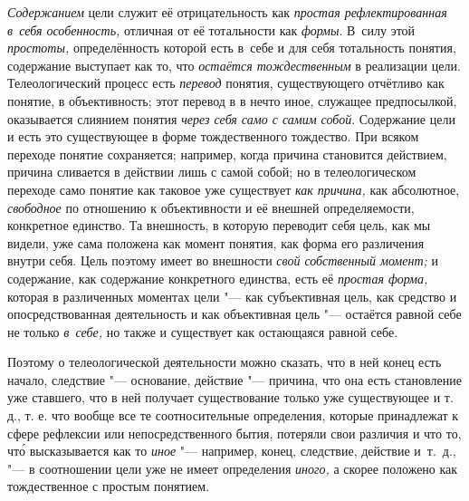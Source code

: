 {\em Содержанием} цели
служит её отрицательность как
{\em простая рефлектированная в~себя
особенность,} отличная от её тотальности как
{\em формы}. В~силу этой
{\em простоты,}
определённость которой есть в~себе и для себя тотальность
понятия, содержание выступает как то, что
{\em остаётся тождественным}
в реализации цели. Телеологический процесс есть
{\em перевод} понятия,
существующего отчётливо как понятие, в объективность; этот перевод в
в нечто иное, служащее предпосылкой, оказывается слиянием понятия
{\em через себя само с самим собой}.
Содержание цели и есть это существующее в форме
тождественного тождество. При всяком переходе понятие сохраняется;
например, когда причина становится действием, причина сливается в действии
лишь с самой собой; но в телеологическом переходе само понятие как таковое
уже существует {\em как причина,}
как абсолютное,
{\em свободное} по
отношению к объективности и её внешней определяемости, конкретное единство.
Та внешность, в которую переводит себя цель, как мы видели, уже сама
положена как момент понятия, как форма его различения внутри себя. Цель
поэтому имеет во внешности {\em свой
собственный момент;} и содержание, как содержание
конкретного единства, есть её
{\em простая форма,}
которая в различенных моментах цели "--- как
субъективная цель, как средство и опосредствованная деятельность и как
объективная цель "--- остаётся равной себе не только
{\em в~себе,} но также и
существует как остающаяся равной себе.

Поэтому о телеологической деятельности можно сказать, что в
ней конец есть начало, следствие "--- основание, действие
"--- причина, что она есть становление уже ставшего, что в ней
получает существование только уже существующее и т. д., т. е. что вообще
все те соотносительные определения, которые принадлежат к сфере рефлексии
или непосредственного бытия, потеряли свои различия и что то, чт\'{о}
высказывается как то
{\em иное} "--- например,
конец, следствие, действие и~т.~д., "--- в соотношении цели уже
не имеет определения
{\em иного,} а скорее
положено как тождественное с простым понятием.

